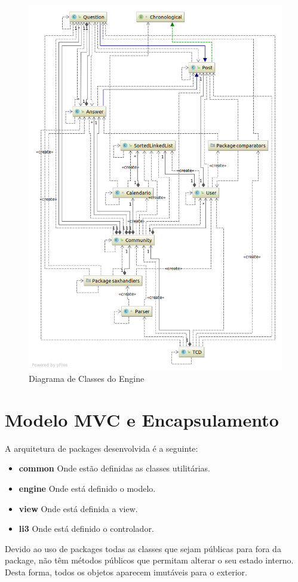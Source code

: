 \documentclass[10pt,a4paper]{report}
\begin{document}
    \begin{figure}[h]
        \centering
        \includegraphics[width=\textwidth]{./images/Model.png}
        \caption{Diagrama de Classes do Engine}
        \label{fig:fulldiagram}
    \end{figure}


\chapter{Modelo MVC e Encapsulamento}
    A arquitetura de packages desenvolvida é a seguinte:
    \begin{itemize}
        \item \textbf{common} Onde estão definidas as classes utilitárias.
        \item \textbf{engine} Onde está definido o modelo.
        \item \textbf{view} Onde está definida a view.
        \item \textbf{li3} Onde está definido o controlador.
    \end{itemize}
    Devido ao uso de packages todas as classes que sejam públicas para fora da
    package, não têm métodos públicos que permitam alterar o seu estado interno.
    Desta forma, todos os objetos aparecem imutáveis para o exterior.
\end{document}
